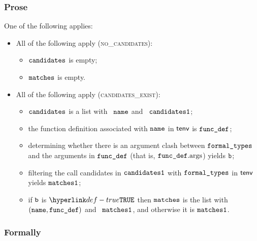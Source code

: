 \subsubsection{Prose}
One of the following applies:
\begin{itemize}
  \item All of the following apply (\textsc{no\_candidates}):
  \begin{itemize}
    \item $\texttt{candidates}$ is empty;
    \item $\texttt{matches}$ is empty.
  \end{itemize}

  \item All of the following apply (\textsc{candidates\_exist}):
  \begin{itemize}
    \item $\texttt{candidates}$ is a list with \head\ $\texttt{name}$ and \tail\ $\texttt{candidates1}$;
    \item the function definition associated with $\texttt{name}$ in $\textsf{tenv}$ is $\texttt{func\_def}$;
    \item determining whether there is an argument clash between $\texttt{formal\_types}$ and the arguments in $\texttt{func\_def}$
          (that is, $\texttt{func\_def}.\text{args}$) yields $\texttt{b}$\ProseOrTypeError;
    \item filtering the call candidates in $\texttt{candidates1}$ with $\texttt{formal\_types}$ in $\textsf{tenv}$ yields $\texttt{matches1}$\ProseOrTypeError;
    \item if $\texttt{b}$ is $\True$ then $\texttt{matches}$ is the list with \head\ $(\texttt{name},\texttt{func\_def})$ and \tail\ $\texttt{matches1}$,
          and otherwise it is $\texttt{matches1}$.
  \end{itemize}
\end{itemize}

\subsubsection{Formally}

